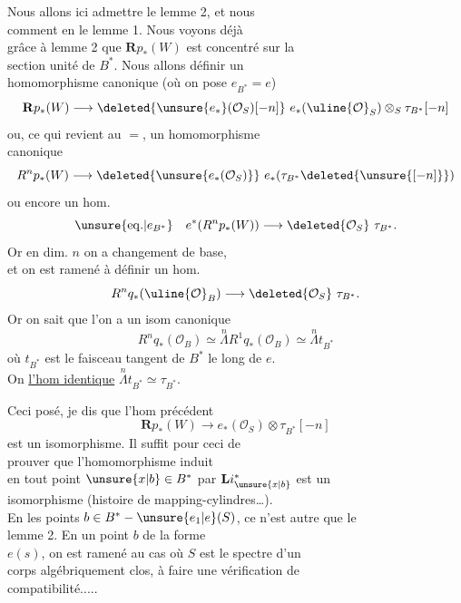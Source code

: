 Nous allons ici admettre le lemme 2, et nous \\
comment en   le lemme 1. Nous voyons déjà\\
grâce à lemme 2 que $\mathbf Rp_*(W)$ est concentré sur la\\
section unité de $B^*$. Nous allons définir un\\
homomorphisme canonique (où on pose $e_{B^*}=e$)
\[
\mathbf Rp_*(W)\longrightarrow\deleted{\unsure{e_*}(\mathcal O_S)[-n]}\ e_*(\uline{\mathcal O}_S)\otimes_S\tau_{B^*}[-n]
\]
ou, ce qui revient au $=$,  un homomorphisme\\
canonique
\[
R^np_*(W)\longrightarrow\deleted{\unsure{e_*(\mathcal O_S)}}\ e_*(\tau_{B^*}\deleted{\unsure{[-n]}})
\]
ou encore un hom.
\[
\unsure{\mathrm{eq.}|e_{B^*}}\quad e^*(R^np_*(W))\longrightarrow\deleted{\mathcal O_S}\ \tau_{B^*}.
\]
Or en dim. $n$ on a  changement de base,\\
et  on est ramené à définir un hom.
\[
R^nq_*(\uline{\mathcal O}_B)\longrightarrow\deleted{\mathcal O_S}\ \tau_{B^*}.
\]
Or on sait que l'on a un isom canonique
\[
R^nq_*(\mathcal O_B)\simeq\overset{n}{\Lambda}R^1q_*(\mathcal O_B)\simeq\overset{n}{\Lambda}t_{B^*}
\]
où $t_{B^*}$ est le faisceau tangent de $B^*$ le long de $e$.\\
On   \uline{l'hom identique} $\overset{n}{\Lambda}t_{B^*}\simeq\tau_{B^*}$.

Ceci posé, je dis que l'hom précédent
\[
\mathbf Rp_*(W)\longrightarrow e_*(\mathcal O_S)\otimes\tau_{B^*}[-n]
\]
est un isomorphisme. Il suffit pour ceci de\\
prouver que l'homomorphisme induit \\
en tout point $\unsure{x|b}\in B^*$ par $\mathbf Li_{\unsure{x|b}}^*$ est un\\
isomorphisme (histoire de mapping-cylindres\ldots).\\
En les points $b\in B^*-\unsure{e_1|e}(S)$, ce n'est autre que le\\
lemme 2. En un point  $b$ de la forme\\
$e(s)$, on est ramené au cas où $S$ est le spectre d'un\\
corps algébriquement clos, à faire une vérification de\\
compatibilité.....

